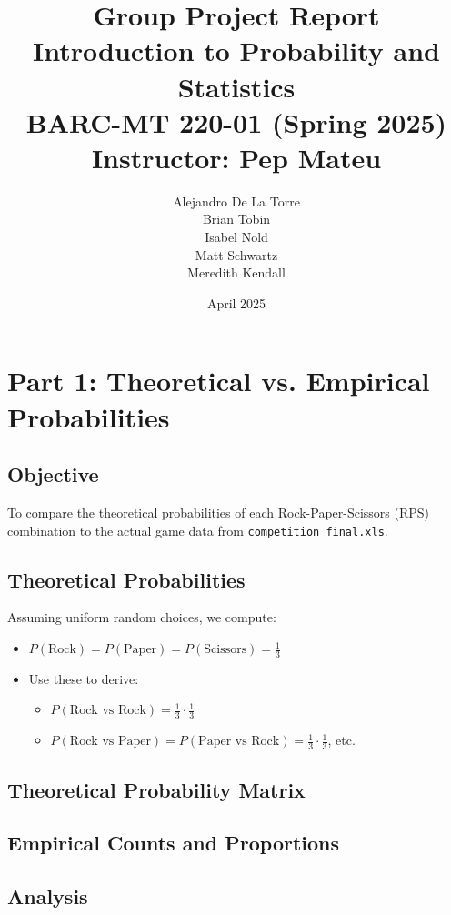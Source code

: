 \documentclass[12pt]{article}
\title{\textbf{Group Project Report}\\
\large Introduction to Probability and Statistics\\
BARC-MT 220-01 (Spring 2025)\\
Instructor: Pep Mateu}
\author{
    Alejandro De La Torre \\
    Brian Tobin \\
    Isabel Nold \\
    Matt Schwartz \\
    Meredith Kendall
}
\date{April 2025}
\begin{document}
\maketitle
\tableofcontents
\newpage

\section*{Part 1: Theoretical vs. Empirical Probabilities}

\subsection*{Objective}
To compare the theoretical probabilities of each Rock-Paper-Scissors (RPS) combination to the actual game data from \texttt{competition\_final.xls}.

\subsection*{Theoretical Probabilities}
Assuming uniform random choices, we compute:
\begin{itemize}
    \item \( P(\text{Rock}) = P(\text{Paper}) = P(\text{Scissors}) = \frac{1}{3} \)
    \item Use these to derive:
    \begin{itemize}
        \item \( P(\text{Rock vs Rock}) = \frac{1}{3} \cdot \frac{1}{3} \)
        \item \( P(\text{Rock vs Paper}) = P(\text{Paper vs Rock}) = \frac{1}{3} \cdot \frac{1}{3} \), etc.
    \end{itemize}
\end{itemize}

\subsection*{Theoretical Probability Matrix}
\begin{center}
\end{center}

\subsection*{Empirical Counts and Proportions}

\subsection*{Analysis}
\end{document}
